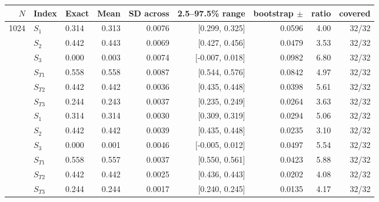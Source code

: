 \begin{tabular}{rllrrrrrr}
\toprule
$N$ & Index & Exact & Mean & SD across & 2.5--97.5\% range & bootstrap $\pm$ & ratio & covered \\
\midrule
1024 & $S_{1}$ & 0.314 & 0.313 & 0.0076 & [0.299, 0.325] & 0.0596 & 4.00 & 32/32 \\
 & $S_{2}$ & 0.442 & 0.443 & 0.0069 & [0.427, 0.456] & 0.0479 & 3.53 & 32/32 \\
 & $S_{3}$ & 0.000 & 0.003 & 0.0074 & [-0.007, 0.018] & 0.0982 & 6.80 & 32/32 \\
 & $S_{T1}$ & 0.558 & 0.558 & 0.0087 & [0.544, 0.576] & 0.0842 & 4.97 & 32/32 \\
 & $S_{T2}$ & 0.442 & 0.442 & 0.0036 & [0.435, 0.448] & 0.0398 & 5.61 & 32/32 \\
 & $S_{T3}$ & 0.244 & 0.243 & 0.0037 & [0.235, 0.249] & 0.0264 & 3.63 & 32/32 \\
\addlinespace
4096 & $S_{1}$ & 0.314 & 0.314 & 0.0030 & [0.309, 0.319] & 0.0294 & 5.06 & 32/32 \\
 & $S_{2}$ & 0.442 & 0.442 & 0.0039 & [0.435, 0.448] & 0.0235 & 3.10 & 32/32 \\
 & $S_{3}$ & 0.000 & 0.001 & 0.0046 & [-0.005, 0.012] & 0.0497 & 5.54 & 32/32 \\
 & $S_{T1}$ & 0.558 & 0.557 & 0.0037 & [0.550, 0.561] & 0.0423 & 5.88 & 32/32 \\
 & $S_{T2}$ & 0.442 & 0.442 & 0.0025 & [0.436, 0.443] & 0.0202 & 4.08 & 32/32 \\
 & $S_{T3}$ & 0.244 & 0.244 & 0.0017 & [0.240, 0.245] & 0.0135 & 4.17 & 32/32 \\
\bottomrule
\end{tabular}
